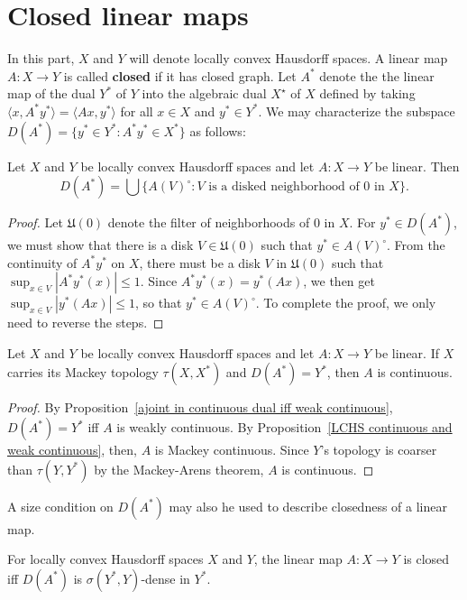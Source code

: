 \section{Closed linear maps}
In this part, $X$ and $Y$ will denote locally convex Hausdorff spaces. A linear map $A:X\to Y$ is called \textbf{closed} if it has closed graph. Let $A^*$ denote the the linear map of the dual $Y^*$ of $Y$ into the algebraic dual $X^{\star}$ of $X$ defined by taking $\langle x,A^*y^*\rangle=\langle Ax,y^*\rangle$ for all $x\in X$ and $y^*\in Y^*$. We may characterize the subspace $D(A^*)=\{y^*\in Y^*:A^*y^*\in X^*\}$ as follows:
\begin{proposition}\label{LCHS domain of adjoint}
Let $X$ and $Y$ be locally convex Hausdorff spaces and let $A:X\to Y$ be linear. Then
\[D(A^*)=\bigcup\{A(V)^\circ:\text{$V$ is a disked neighborhood of $0$ in $X$}\}.\]
\end{proposition}
\begin{proof}
Let $\mathfrak{U}(0)$ denote the filter of neighborhoods of $0$ in $X$. For $y^*\in D(A^*)$, we must show that there is a disk $V\in\mathfrak{U}(0)$ such that $y^*\in A(V)^\circ$. From the continuity of $A^*y^*$ on $X$, there must be a disk $V$ in $\mathfrak{U}(0)$ such that $\sup_{x\in V}|A^*y^*(x)|\leq 1$. Since $A^*y^*(x)=y^*(Ax)$, we then get $\sup_{x\in V}|y^*(Ax)|\leq 1$, so that $y^*\in A(V)^\circ$. To complete the proof, we only need to reverse the steps.
\end{proof}
\begin{proposition}\label{LCHS Mackey space weak continuous is continuous}
Let $X$ and $Y$ be locally convex Hausdorff spaces and let $A:X\to Y$ be linear. If $X$ carries its Mackey topology $\tau(X,X^*)$ and $D(A^*)=Y^*$, then $A$ is continuous.
\end{proposition}
\begin{proof}
By Proposition~\ref{ajoint in continuous dual iff weak continuous}, $D(A^*)=Y^*$ iff $A$ is weakly continuous. By Proposition~\ref{LCHS continuous and weak continuous}, then, $A$ is Mackey continuous. Since $Y$'s topology is coarser than $\tau(Y,Y^*)$ by the Mackey-Arens theorem, $A$ is continuous.
\end{proof}
A size condition on $D(A^*)$ may also he used to describe closedness of a linear map.
\begin{proposition}\label{LCHS closed iff D(A^*) weakly dense}
For locally convex Hausdorff spaces $X$ and $Y$, the linear map $A:X\to Y$ is closed iff $D(A^*)$ is $\sigma(Y^*,Y)$-dense in $Y^*$.
\end{proposition}

